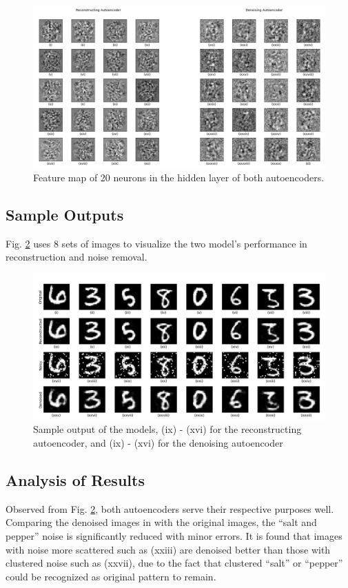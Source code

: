 \documentclass[11pt,titlepage]{article}
\begin{document}
\begin{figure}[H]
		\includegraphics[width=\linewidth]{img/h4p1_feature}
		\caption{Feature map of 20 neurons in the hidden layer of both autoencoders.}
		\label{fig:autoenc_feature}
\end{figure}








\subsection{Sample Outputs}

Fig. \ref{fig:autoenc_output} uses 8 sets of images to visualize the two model's performance in reconstruction and noise removal.

\begin{figure}[htb]
	\centering
	\includegraphics[width=\linewidth]{img/h4p1_outputs}
	\caption{Sample output of the models, (ix) - (xvi) for the reconstructing autoencoder, and (ix) - (xvi) for the denoising autoencoder}
	\label{fig:autoenc_output}
\end{figure}


\newpage
\subsection{Analysis of Results}
Observed from Fig. \ref{fig:autoenc_output}, both autoencoders serve their respective purposes well. Comparing the denoised images in with the original images, the ``salt and pepper'' noise is significantly reduced with minor errors. It is found that images with noise more scattered such as (xxiii) are denoised better than those with clustered noise such as (xxvii), due to the fact that clustered ``salt'' or ``pepper'' could be recognized as original pattern to remain.
\end{document}
